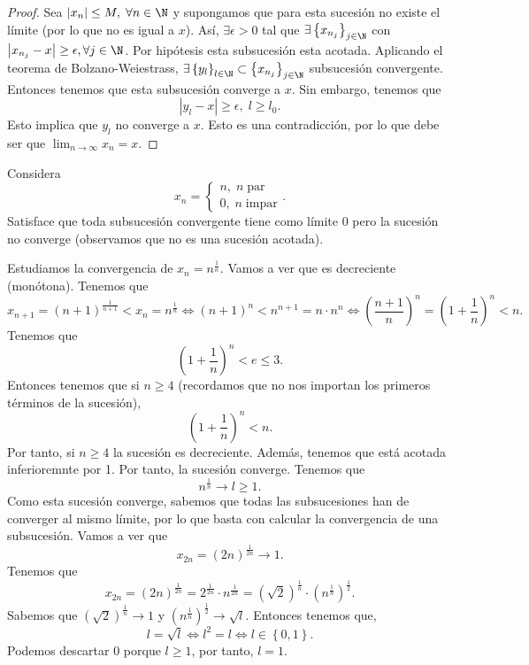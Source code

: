 \begin{proof}
	Sea $\displaystyle \left|x_{n}\right| \leq M, \; \forall n \in \N $ y supongamos que para esta sucesión no existe el límite (por lo que no es igual a $\displaystyle x $). Así, $\displaystyle \exists \epsilon > 0 $ tal que $\displaystyle \exists \left\{ x_{n_{j}}\right\}_{j\in\N}  $ con $\displaystyle \left|x_{n_{j}}-x\right|\geq \epsilon, \forall j \in \N  $. Por hipótesis esta subsucesión esta acotada. Aplicando el teorema de Bolzano-Weiestrass, $\displaystyle \exists \left\{ y_{l}\right\} _{l\in\N} \subset \left\{ x_{n_{j}}\right\} _{j\in\N}$ subsucesión convergente. Entonces tenemos que esta subsucesión converge a $\displaystyle x $. Sin embargo, tenemos que 
	\[ \left|y_{l}-x\right| \geq \epsilon, \; l \geq l_{0} .\]
Esto implica que $\displaystyle y_{l} $ no converge a $\displaystyle x $. Esto es una contradicción, por lo que debe ser que $\displaystyle \lim_{n \to \infty}x_{n} = x $.
\end{proof}

\begin{eg}
	\normalfont Considera
\[x_{n} = 
\begin{cases}
n, \; n \; \text{par} \\
0, \; n \; \text{impar} 
\end{cases}
.\]
Satisface que toda subsucesión convergente tiene como límite $\displaystyle 0 $ pero la sucesión no converge (observamos que no es una sucesión acotada).
\end{eg}

\begin{eg}
\normalfont Estudiamos la convergencia de $\displaystyle x_{n} = n^{\frac{1}{n}} $. Vamos a ver que es decreciente (monótona). Tenemos que
\[x_{n+1} = \left(n+1\right)^{\frac{1}{n+1}} < x_{n} = n^{\frac{1}{n}} \iff \left(n+1\right)^{n} < n^{n+1} = n \cdot n^{n} \iff \left(\frac{n+1}{n}\right)^{n} = \left(1+\frac{1}{n}\right)^{n} < n .\]
Tenemos que
\[ \left(1 + \frac{1}{n}\right)^{n} < e \leq 3 .\]
Entonces tenemos que si $\displaystyle n\geq 4 $ (recordamos que no nos importan los primeros términos de la sucesión),
\[ \left(1 +\frac{1}{n}\right)^{n} < n .\]
Por tanto, si $\displaystyle n\geq 4 $ la sucesión es decreciente. Además, tenemos que está acotada inferioremnte por 1. Por tanto, la sucesión converge. Tenemos que
\[n^{\frac{1}{n}} \to l \geq 1 .\]
Como esta sucesión converge, sabemos que todas las subsucesiones han de converger al mismo límite, por lo que basta con calcular la convergencia de una subsucesión. Vamos a ver que
\[x_{2n} = \left(2n\right)^{\frac{1}{2n}} \to 1.\]
Tenemos que
\[x_{2n} = \left(2n\right)^{\frac{1}{2n}} = 2^{\frac{1}{2n}} \cdot n^{\frac{1}{2n}} = \left(\sqrt{2}\right)^{\frac{1}{n}} \cdot \left(n^{\frac{1}{n}}\right)^{\frac{1}{2}} .\]
Sabemos que $\displaystyle \left(\sqrt{2}\right)^{\frac{1}{n}} \to 1 $ y $\displaystyle \left(n^{\frac{1}{n}}\right)^{\frac{1}{2}} \to \sqrt{l} $. Entonces tenemos que, 
\[l = \sqrt{l} \iff l^{2} = l \iff l \in \left\{ 0,1\right\}  .\]
Podemos descartar 0 porque $\displaystyle l \geq 1 $, por tanto, $\displaystyle l = 1 $.
\end{eg}

